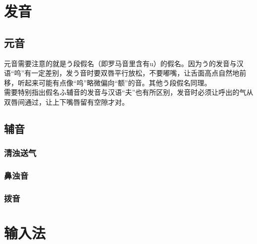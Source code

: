 \documentclass[12pt, a4paper, oneside]{book}
\begin{document}
\chapter{发音}\label{chap:prn}
\section{元音}
元音需要注意的就是う段假名（即罗马音里含有u）的假名。因为う的发音与汉语“呜”有一定差别，发う音时要双唇平行放松，不要嘟嘴，让舌面高点自然地前移，听起来可能有点像“呜”略微偏向“额”的音。其他う段假名同理。\\
需要特别指出假名ふ辅音的发音与汉语“夫”也有所区别，发音时必须让呼出的气从双唇间通过，让上下嘴唇留有空隙才对。
\section{辅音}
\subsection{清浊送气}
\subsection{鼻浊音}
\subsection{拨音}
\chapter{输入法}
\end{document}
